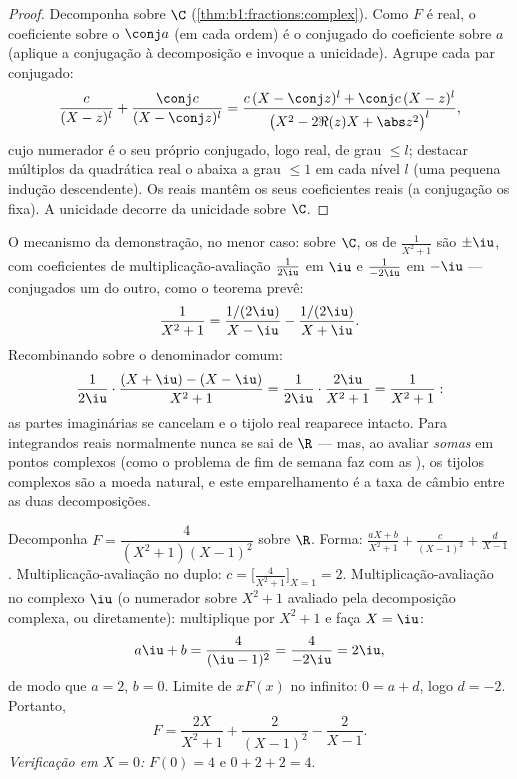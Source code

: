 \begin{proof}
Decomponha sobre $\C$ (\cref{thm:b1:fractions:complex}). Como $F$ é
real, o coeficiente sobre o  $\conj a$ (em cada ordem) é o
conjugado do coeficiente sobre $a$ (aplique a conjugação à
decomposição e invoque a unicidade). Agrupe cada par conjugado:
\[
\frac{c}{(X - z)^l} + \frac{\conj c}{(X - \conj z)^l}
= \frac{c\,(X - \conj z)^l + \conj c\,(X - z)^l}{\bigl(X^2 - 2\Re(z)X
+ \abs z^2\bigr)^{l}},
\]
cujo numerador é o seu próprio conjugado, logo real, de grau $\leq l$;
destacar múltiplos da quadrática real o abaixa a grau
$\leq 1$ em cada nível $l$ (uma pequena indução descendente). Os 
reais mantêm os seus coeficientes reais (a conjugação os fixa). A
unicidade decorre da unicidade sobre $\C$.
\end{proof}

\begin{example}\label{ex:b1:fractions:pairing}
O mecanismo da demonstração, no menor caso: sobre $\C$, os
 de $\frac1{X^2+1}$ são $\pm\iu$, com coeficientes de
multiplicação-avaliação $\frac1{2\iu}$ em $\iu$ e $\frac1{-2\iu}$ em $-\iu$ ---
conjugados um do outro, como o teorema prevê:
\[
\frac{1}{X^2 + 1}
= \frac{1/(2\iu)}{X - \iu} - \frac{1/(2\iu)}{X + \iu} .
\]
Recombinando sobre o denominador comum:
\[
\frac{1}{2\iu}\cdot\frac{(X + \iu) - (X - \iu)}{X^2 + 1}
= \frac{1}{2\iu}\cdot\frac{2\iu}{X^2 + 1} = \frac{1}{X^2+1} :
\]
as partes imaginárias se cancelam e o tijolo real reaparece intacto.
Para integrandos reais normalmente nunca se sai de $\R$ --- mas, ao
avaliar \emph{somas} em pontos complexos (como o problema de fim de
semana faz com as ), os tijolos complexos são a moeda
natural, e este emparelhamento é a taxa de câmbio entre as duas
decomposições.
\end{example}

\begin{example}\label{ex:b1:fractions:real}
Decomponha $F = \dfrac{4}{(X^2+1)(X-1)^2}$ sobre $\R$. Forma:
$\frac{aX + b}{X^2 + 1} + \frac{c}{(X-1)^2} + \frac{d}{X - 1}$.
Multiplicação-avaliação no  duplo: $c = \bigl[\frac{4}{X^2+1}\bigr]_{X=1} =
2$. Multiplicação-avaliação no  complexo $\iu$ (o numerador sobre
$X^2 + 1$ avaliado pela decomposição complexa, ou diretamente):
multiplique por $X^2 + 1$ e faça $X = \iu$:
\[
a\iu + b = \frac{4}{(\iu - 1)^2} = \frac{4}{-2\iu} = 2\iu ,
\]
de modo que $a = 2$, $b = 0$. Limite de $xF(x)$ no infinito: $0 = a + d$, logo
$d = -2$. Portanto,
\[
F = \frac{2X}{X^2+1} + \frac{2}{(X-1)^2} - \frac{2}{X-1} .
\]
\emph{Verificação em $X = 0$:} $F(0) = 4$ e $0 + 2 + 2 = 4$.
\end{example}

